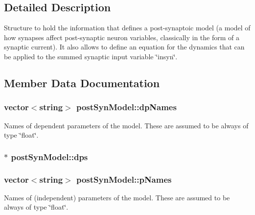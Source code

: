 \subsection{Detailed Description}
Structure to hold the information that defines a post-\/synaptoic model (a model of how synapses affect post-\/synaptic neuron variables, classically in the form of a synaptic current). It also allows to define an equation for the dynamics that can be applied to the summed synaptic input variable \char`\"{}insyn\char`\"{}. 

\subsection{Member Data Documentation}
\hypertarget{structpostSynModel_a1deddbf488ffa49ec90f084791d9ebe3}{
\subsubsection[{dp\+Names}]{\setlength{\rightskip}{0pt plus 5cm}vector$<$string$>$ post\+Syn\+Model\+::dp\+Names}}\label{structpostSynModel_a1deddbf488ffa49ec90f084791d9ebe3}


Names of dependent parameters of the model. These are assumed to be always of type \char`\"{}float\char`\"{}. 

\hypertarget{structpostSynModel_a5c0093ffd554c603c21cce0c1b440373}{
\subsubsection[{dps}]{$\ast$ post\+Syn\+Model\+::dps}}\label{structpostSynModel_a5c0093ffd554c603c21cce0c1b440373}
\hypertarget{structpostSynModel_ae34333d8fa06e35cb7595a1228cc76ca}{
\subsubsection[{p\+Names}]{\setlength{\rightskip}{0pt plus 5cm}vector$<$string$>$ post\+Syn\+Model\+::p\+Names}}\label{structpostSynModel_ae34333d8fa06e35cb7595a1228cc76ca}


Names of (independent) parameters of the model. These are assumed to be always of type \char`\"{}float\char`\"{}. 

